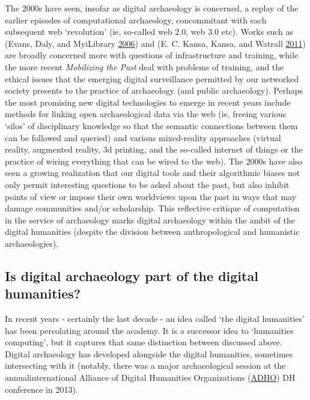 \documentclass[english,]{book}
\begin{document}
The 2000s have seen, insofar as digital archaeology is concerned, a
replay of the earlier episodes of computational archaeology,
concommitant with each subsequent web `revolution' (ie, so-called web
2.0, web 3.0 etc). Works such as (Evans, Daly, and MyiLibrary
\protect\hyperlink{ref-evans_digital_2006}{2006}) and (E. C. Kansa,
Kansa, and Watrall \protect\hyperlink{ref-kansa_archaeology_2011}{2011})
are broadly concerned more with questions of infrastructure and
training, while the more recent \emph{Mobilizing the Past} deal with
problems of training, and the ethical issues that the emerging digital
surveillance permitted by our networked society presents to the practice
of archaeology (and public archaeology). Perhaps the most promising new
digital technologies to emerge in recent years include methods for
linking open archaeological data via the web (ie, freeing various
`silos' of disciplinary knowledge so that the semantic connections
between them can be followed and queried) and various mixed-reality
approaches (virtual reality, augmented reality, 3d printing, and the
so-called internet of things or the practice of wiring everything that
can be wired to the web). The 2000s have also seen a growing realization
that our digital tools and their algorithmic biases not only permit
interesting questions to be asked about the past, but also inhibit
points of view or impose their own worldviews upon the past in ways that
may damage communities and/or scholarship. This reflective critique of
computation in the service of archaeology marks digital archaeology
within the ambit of the digital humanities (despite the division between
anthropological and humanistic archaeologies).

\subsection{Is digital archaeology part of the digital
humanities?}\label{is-digital-archaeology-part-of-the-digital-humanities}

In recent years - certainly the last decade - an idea called `the
digital humanities' has been percolating around the academy. It is a
successor idea to `humanities computing', but it captures that same
distinction between discussed above. Digital archaeology has developed
alongside the digital humanities, sometimes intersecting with it
(notably, there was a major archaeological session at the
annualinternational Alliance of Digital Humanities Organizations
(\href{http://adho.org/}{ADHO}) DH conference in 2013).
\end{document}
